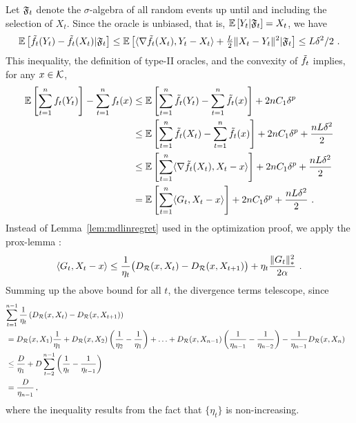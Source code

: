 Let $\mathfrak{F}_t$ denote the $\sigma$-algebra of all random events up until and including the selection of $X_t$. Since the oracle is unbiased, that is,  $\mathbb{E}\left[Y_t|\mathfrak{F}_t\right]=X_t$, we have
\begin{equation}
\mathbb{E}\left[\tilde{f}_t(Y_t)-\tilde{f}_t(X_t)|\mathfrak{F}_t\right] \le \mathbb{E}\left[\langle \nabla \tilde{f}_t(X_t),Y_t-X_t \rangle+\tfrac{L}{2}\|X_t-Y_t\|^2|\mathfrak{F}_t\right] \le L\delta^2/2~.
\label{eq:YX}
\end{equation}
This inequality, the definition of type-II oracles, and the convexity of $\tilde{f}_t$ implies, for any $x \in \mathcal{K}$,
\begin{align}
\mathbb{E}\left[\sum_{t=1}^n f_t(Y_t)\right] - \sum_{t=1}^n f_t(x) 
& \le \mathbb{E}\left[\sum_{t=1}^n \tilde{f}_t(Y_t) -  \sum_{t=1}^n \tilde{f}_t(x)\right] + 2 n C_1 \delta^{p} \nonumber \\
& \le \mathbb{E}\left[\sum_{t=1}^n \tilde{f}_t(X_t) -  \sum_{t=1}^n \tilde{f}_t(x)\right] + 2 n C_1 \delta^{p} + \frac{n L \delta^2}{2} \nonumber \\
& \le \mathbb{E}\left[\sum_{t=1}^n \langle \nabla \tilde{f}_t(X_t), X_t-x  \rangle\right] + 2 n C_1 \delta^{p} + \frac{n L \delta^2}{2} \label{eq:t2-lin} \\
& = \mathbb{E}\left[\sum_{t=1}^n \langle G_t, X_t-x  \rangle\right] + 2 n C_1 \delta^{p} + \frac{n L \delta^2}{2}~.
\label{eq:t2-grad}
\end{align}
Instead of Lemma~\ref{lem:mdlinregret} used in the optimization proof, we apply the prox-lemma \citep[see, e.g.,][]{Beck2003mirror, NeJuLaSh09}:
\begin{equation}
\label{eq:proxlemma}
\langle G_t,X_t-x \rangle \le \frac{1}{\eta_t}\big(D_{\mathcal{R}}(x,X_t)-D_{\mathcal{R}}(x,X_{t+1})\big) + \eta_t \frac{\|G_t\|_*^2}{2\alpha}~.
\end{equation}
Summing up the above bound for all $t$, the divergence terms telescope, since
\begin{align}
\lefteqn{\sum_{t=1}^{n-1} \frac{1}{\eta_t} \left(\DR(x,X_t)-\DR(x,X_{t+1})\right)}
 \nonumber \\
&= \DR(x,X_1) \frac{1}{\eta_1} + \DR(x,X_2) \left(\frac{1}{\eta_2}-\frac{1}{\eta_1}\right)
+ \ldots+\DR(x,X_{n-1}) \left(\frac{1}{\eta_{n-1}} -\frac{1}{\eta_{n-2}}\right)- \frac{1}{\eta_{n-1}} \DR(x,X_n) \nonumber \\
& \le \frac{D}{\eta_1} + D \sum_{t=2}^{n-1} \left(\frac1{\eta_{t}}-\frac1{\eta_{t-1}}\right) \nonumber \\
& = \frac{D}{\eta_{n-1}}\,,  \label{eq:div-telescope}
\end{align}
where the inequality results from the fact that $\{\eta_t\}$ is non-increasing.


